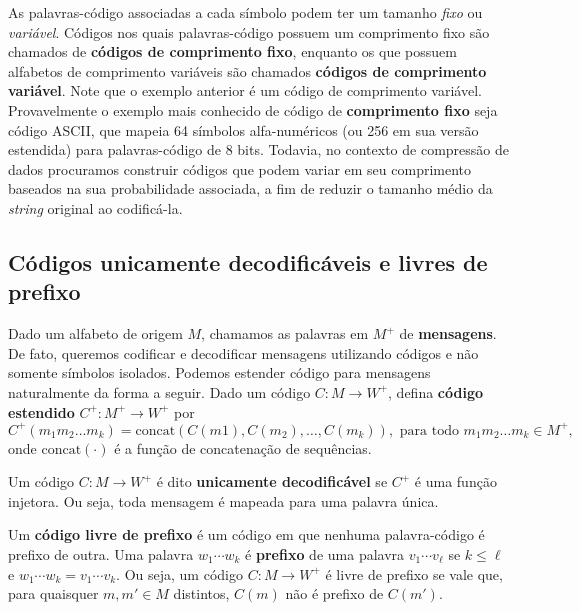 As palavras-código associadas a cada símbolo podem ter um tamanho \emph{fixo} ou \emph{variável}.
Códigos nos quais palavras-código possuem um comprimento fixo são chamados de \textbf{códigos de comprimento fixo}, enquanto os que possuem alfabetos de comprimento variáveis são chamados \textbf{códigos de comprimento variável}. Note que o exemplo anterior é um código de comprimento variável. 
Provavelmente o exemplo mais conhecido de código de \textbf{comprimento fixo} seja código ASCII, que mapeia 64 símbolos alfa-numéricos (ou 256 em sua versão estendida) para palavras-código de 8 bits. 
Todavia, no contexto de compressão de dados procuramos construir códigos que podem variar em seu comprimento baseados na sua probabilidade associada, a fim de reduzir o tamanho médio da \emph{string} original ao codificá-la.

\subsection{Códigos unicamente decodificáveis e livres de prefixo}

Dado um alfabeto de origem $M$, chamamos as palavras em $M^+$ de
\textbf{mensagens}. De fato, queremos codificar e decodificar
mensagens utilizando códigos e não somente símbolos isolados. Podemos
estender código para mensagens naturalmente da forma a seguir. Dado um
código $C\colon M\to W^+$, defina \textbf{código estendido} $C^+: M^+\to W^+$ por
\begin{equation*}
  C^+(m_1m_2\dotsc m_k) =
  \textrm{concat}(C(m1),C(m_2),\dotsc,C(m_k)), \text{ para todo }m_1m_2\dotsc m_k\in M^+,
\end{equation*}
onde $\textrm{concat}(\cdot)$ é a função de concatenação de sequências.


Um código $C\colon M\to W^+$ é dito \textbf{unicamente decodificável}
se $C^+$ é uma função injetora. Ou seja, toda mensagem é mapeada para
uma palavra única.

Um \textbf{código livre de prefixo} é um código em que nenhuma palavra-código é prefixo de outra. 
Uma palavra $w_1\dotsm w_k$ é
\textbf{prefixo} de uma palavra $v_1\dotsm v_\ell$ se $k\leq \ell$ e
$w_1\dotsm w_k = v_1\dotsm v_k$. Ou seja, um código $C\colon M\to W^+$
é livre de prefixo se vale que, para quaisquer $m,m' \in M$ distintos,
$C(m)$ não é prefixo de $C(m')$.

